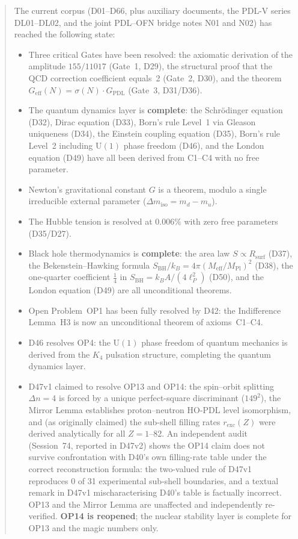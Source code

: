 \documentclass[11pt,a4paper]{article}
\theoremstyle{plain}
\theoremstyle{definition}
\theoremstyle{remark}
\newcommand{\Kfour}{K_4}
\newcommand{\Geff}{G_{\mathrm{eff}}}
\newcommand{\GPDL}{G_{\mathrm{PDL}}}
\newcommand{\Rsurf}{R_{\mathrm{surf}}}
\newcommand{\sigmaN}{\sigma(N)}
\newcommand{\SBH}{S_{\mathrm{BH}}}
\newcommand{\Meff}{M_{\mathrm{eff}}}
\newcommand{\MPl}{M_{\mathrm{Pl}}}
\begin{document}
\begin{abstract}
The current corpus (D01--D66, plus auxiliary documents, the PDL-V series DL01--DL02, and the joint PDL--OFN bridge notes N01 and N02) has reached the following state:
\begin{itemize}
\item Three critical Gates have been resolved: the axiomatic derivation of the amplitude $155/11017$ (Gate~1, D29), the structural proof that the QCD correction coefficient equals~2 (Gate~2, D30), and the theorem $\Geff(N)=\sigmaN\cdot\GPDL$ (Gate~3, D31/D36).
\item The quantum dynamics layer is \textbf{complete}: the Schr\"odinger equation (D32), Dirac equation (D33), Born's rule Level~1 via Gleason uniqueness (D34), the Einstein coupling equation (D35), Born's rule Level~2 including $\mathrm{U}(1)$ phase freedom (D46), and the London equation (D49) have all been derived from C1--C4 with no free parameter.
\item Newton's gravitational constant $G$ is a theorem, modulo a single irreducible external parameter ($\Delta m_{\mathrm{iso}} = m_d - m_u$).
\item The Hubble tension is resolved at $0.006\%$ with zero free parameters (D35/D27).
\item Black hole thermodynamics is \textbf{complete}: the area law $S \propto \Rsurf$ (D37), the Bekenstein--Hawking formula $\SBH/k_B = 4\pi(\Meff/\MPl)^2$ (D38), the one-quarter coefficient $\tfrac{1}{4}$ in $\SBH = k_B A/(4\ell_P^2)$ (D50), and the London equation (D49) are all unconditional theorems.
\item Open Problem~OP1 has been fully resolved by D42: the Indifference Lemma~H3 is now an unconditional theorem of axioms~C1--C4.
\item D46 resolves OP4: the $\mathrm{U}(1)$ phase freedom of quantum mechanics is derived from the $\Kfour$ pulsation structure, completing the quantum dynamics layer.
\item D47v1 claimed to resolve OP13 and OP14: the spin--orbit splitting $\Delta n = 4$ is forced by a unique perfect-square discriminant ($149^2$), the Mirror Lemma establishes proton--neutron HO-PDL level isomorphism, and (as originally claimed) the sub-shell filling rates $r_{\mathrm{exc}}(Z)$ were derived analytically for all $Z = 1$--82. \textcolor{negativered}{An independent audit (Session~74, reported in D47v2) shows the OP14 claim does not survive confrontation with D40's own filling-rate table under the correct reconstruction formula: the two-valued rule of D47v1 reproduces 0 of 31 experimental sub-shell boundaries, and a textual remark in D47v1 mischaracterising D40's table is factually incorrect.} OP13 and the Mirror Lemma are unaffected and independently re-verified. \textbf{OP14 is reopened}; the nuclear stability layer is complete for OP13 and the magic numbers only.

\end{itemize}
\end{abstract}
\end{document}
